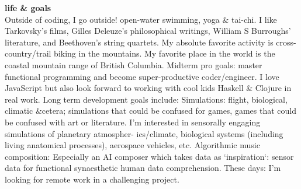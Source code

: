 \sectionSep
{\bf life \& goals}
\\ Outside of coding, I go outside! open-water swimming, yoga \& tai-chi. I like Tarkovsky's films, Gilles Deleuze's philosophical writings, William S Burroughs' literature, and Beethoven's string quartets. My absolute favorite activity is cross-country/trail biking in the mountains. My favorite place in the world is the
coastal mountain range of British Columbia.
Midterm pro goals: master functional programming and become super-productive coder/engineer. I love JavaScript but also look forward to working with cool kids Haskell \& Clojure in real work.
Long term development goals include:
Simulations: flight, biological, climatic \&cetera; simulations that could be confused for games, games that could be confused with art or literature. I'm interested in sensorally engaging simulations of planetary atmospher-
ics/climate, biological systems (including living anatomical processes), aerospace vehicles, etc.
Algorithmic music composition: Especially an AI composer which takes data as `inspiration`: sensor data
for functional synaesthetic human data comprehension.
These days: I'm looking for remote work in a challenging project.





